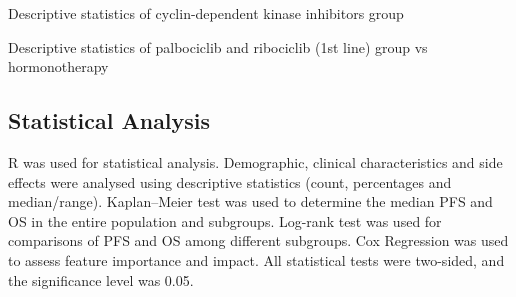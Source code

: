  
\begin{table}
\caption{Descriptive statistics of cyclin-dependent kinase inhibitors group}
\centering
\label{tab:stats_ipop_cdk}

\end{table}


\begin{table}[]
\caption{Descriptive statistics of palbociclib and ribociclib (1st line) group vs hormonotherapy}
\centering

\label{tab:stats_ipop_control}

\end{table}

\subsection{Statistical Analysis}
R was used for statistical analysis. Demographic, clinical characteristics and side effects were analysed using descriptive statistics (count, percentages and median/range). Kaplan–Meier test was used to determine the median PFS and OS in the entire population and subgroups. Log-rank test was used for comparisons of PFS and OS among different subgroups. Cox Regression was used to assess feature importance and impact. All statistical tests were two-sided, and the significance level was 0.05. 







